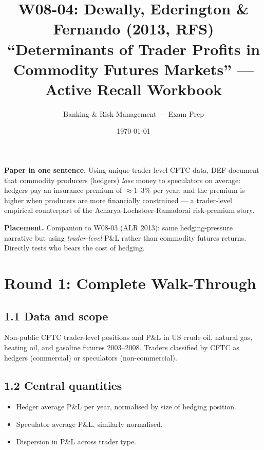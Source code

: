 \documentclass[11pt]{article}
\title{W08-04: Dewally, Ederington \& Fernando (2013, RFS) \\
\large ``Determinants of Trader Profits in Commodity Futures Markets'' --- Active Recall Workbook}
\author{Banking \& Risk Management --- Exam Prep}
\date{\today}
\begin{document}
\maketitle

\begin{keybox}
\textbf{Paper in one sentence.} Using unique trader-level CFTC data, DEF document that commodity producers (hedgers) \emph{lose} money to speculators on average: hedgers pay an insurance premium of $\approx 1$--$3\%$ per year, and the premium is higher when producers are more financially constrained --- a trader-level empirical counterpart of the Acharya-Lochstoer-Ramadorai risk-premium story.

\textbf{Placement.} Companion to W08-03 (ALR 2013): same hedging-pressure narrative but using \emph{trader-level} P\&L rather than commodity futures returns. Directly tests who bears the cost of hedging.
\end{keybox}

\section*{Round 1: Complete Walk-Through}

\subsection*{1.1 Data and scope}
Non-public CFTC trader-level positions and P\&L in US crude oil, natural gas, heating oil, and gasoline futures 2003--2008. Traders classified by CFTC as hedgers (commercial) or speculators (non-commercial).

\subsection*{1.2 Central quantities}
\begin{itemize}
\item Hedger average P\&L per year, normalised by size of hedging position.
\item Speculator average P\&L, similarly normalised.
\item Dispersion in P\&L across trader type.
\end{itemize}
\end{document}

